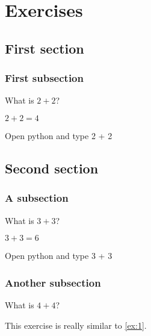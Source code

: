 \documentclass[oneside]{book}
\begin{document}
\chapter{Exercises}

\section{First section}

\subsection{First subsection}

\begin{exercise}[subtitle={Simple Addition}]
  What is \(2 + 2\)?
\end{exercise}

\begin{solution}
  \(2 + 2 = 4\)
\end{solution}

\begin{additionalinformation}
Open python and type 2 + 2
\end{additionalinformation}

\section{Second section}

\subsection{A subsection}

\begin{exercise}[examdate={January 14, 2020}, examproblemnumber={1}, examproblemid={2020-01-14-01}]
  What is \(3 + 3\)?
\end{exercise}

\begin{solution}
  \(3 + 3 = 6\)
\end{solution}

\begin{additionalinformation}
Open python and type 3 + 3
\end{additionalinformation}

\subsection{Another subsection}

\begin{exercise}
  What is \(4 + 4\)?

  This exercise is really similar to \cref{ex:1}.
\end{exercise}
\end{document}
